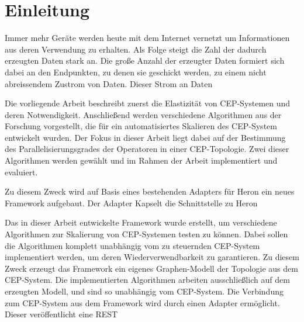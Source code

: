 
\chapter{Einleitung}

Immer mehr Geräte werden heute mit dem Internet vernetzt um Informationen aus deren Verwendung zu erhalten.
Als Folge steigt die Zahl der dadurch erzeugten Daten stark an.
Die große Anzahl der erzeugter Daten formiert sich dabei an den Endpunkten, zu denen sie geschickt werden, zu einem nicht abreissendem Zustrom von Daten.
Dieser Strom an Daten 

Die vorliegende Arbeit beschreibt zuerst die Elastizität von CEP-Systemen und deren Notwendigkeit.
Anschließend werden verschiedene Algorithmen aus der Forschung vorgestellt, die für ein automatisiertes Skalieren des CEP-System entwickelt wurden.
Der Fokus in dieser Arbeit liegt dabei auf der Bestimmung des Parallelisierungsgrades der Operatoren in einer CEP-Topologie.
Zwei dieser Algorithmen werden gewählt und im Rahmen der Arbeit implementiert und evaluiert.

Zu diesem Zweck wird auf Basis eines bestehenden Adapters für Heron ein neues Framework aufgebaut.
Der Adapter Kapselt die Schnittstelle zu Heron 

Das in dieser Arbeit entwickelte Framework wurde erstellt, um verschiedene Algorithmen zur Skalierung von CEP-Systemen testen zu können.
Dabei sollen die Algorithmen komplett unabhängig vom zu steuernden CEP-System implementiert werden, um deren Wiederverwendbarkeit zu garantieren.
Zu diesem Zweck erzeugt das Framework ein eigenes Graphen-Modell der Topologie aus dem CEP-System.
Die implementierten Algorithmen arbeiten ausschließlich auf dem erzeugten Modell, und sind so unabhängig vom CEP-System.
Die Verbindung zum CEP-System aus dem Framework wird durch einen Adapter ermöglicht.
Dieser veröffentlicht eine REST
